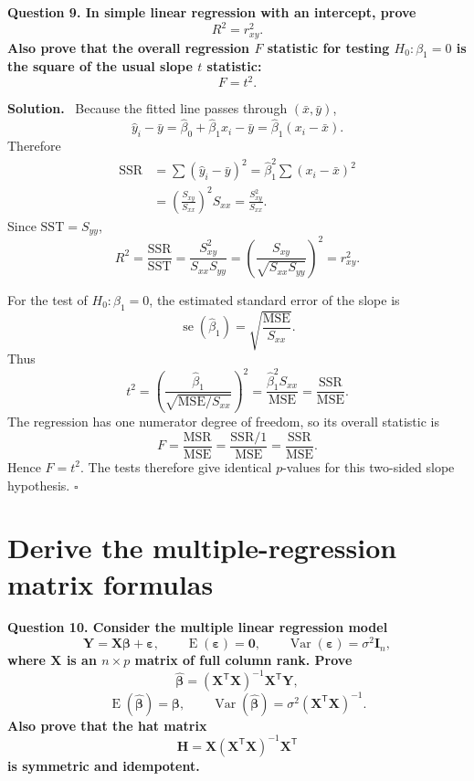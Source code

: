 \documentclass[11pt]{article}
\newcommand{\Sxx}{S_{xx}}
\newcommand{\Sxy}{S_{xy}}
\newcommand{\Syy}{S_{yy}}
\newcommand{\bzero}{\widehat{\beta}_0}
\newcommand{\bone}{\widehat{\beta}_1}
\newcommand{\yhat}{\widehat{y}}
\newcommand{\Var}{\operatorname{Var}}
\newcommand{\E}{\operatorname{E}}
\newenvironment{question}
  {\par\medskip\noindent\color{navy}\bfseries}
  {\par\medskip\color{black}}
\newenvironment{solution}
  {\noindent\color{darkgreen}\textbf{Solution.}\color{black}\ }
  {\hfill$\square$\par\medskip}
\begin{document}
\begin{question}
Question 9. In simple linear regression with an intercept, prove
\[
 \boxed{R^2=r_{xy}^2}.
\]
Also prove that the overall regression $F$ statistic for testing
$H_0:\beta_1=0$ is the square of the usual slope $t$ statistic:
\[
 \boxed{F=t^2}.
\]
\end{question}

\begin{solution}
Because the fitted line passes through $(\bar x,\bar y)$,
\[
 \yhat_i-\bar y
 =\bzero+\bone x_i-\bar y
 =\bone(x_i-\bar x).
\]
Therefore
\begin{align*}
\mathrm{SSR}
 &=\sum(\yhat_i-\bar y)^2
 =\bone^2\sum(x_i-\bar x)^2\\
 &=\left(\frac{\Sxy}{\Sxx}\right)^2\Sxx
 =\frac{\Sxy^2}{\Sxx}.
\end{align*}
Since $\mathrm{SST}=\Syy$,
\[
 R^2=\frac{\mathrm{SSR}}{\mathrm{SST}}
 =\frac{\Sxy^2}{\Sxx\Syy}
 =\left(\frac{\Sxy}{\sqrt{\Sxx\Syy}}\right)^2
 =r_{xy}^2.
\]

For the test of $H_0:\beta_1=0$, the estimated standard error of the slope is
\[
 \operatorname{se}(\bone)=\sqrt{\frac{\mathrm{MSE}}{\Sxx}}.
\]
Thus
\[
 t^2
 =\left(\frac{\bone}{\sqrt{\mathrm{MSE}/\Sxx}}\right)^2
 =\frac{\bone^2\Sxx}{\mathrm{MSE}}
 =\frac{\mathrm{SSR}}{\mathrm{MSE}}.
\]
The regression has one numerator degree of freedom, so its overall statistic is
\[
 F=\frac{\mathrm{MSR}}{\mathrm{MSE}}
 =\frac{\mathrm{SSR}/1}{\mathrm{MSE}}
 =\frac{\mathrm{SSR}}{\mathrm{MSE}}.
\]
Hence $F=t^2$. The tests therefore give identical $p$-values for this
two-sided slope hypothesis.
\end{solution}

\section{Derive the multiple-regression matrix formulas}

\begin{question}
Question 10. Consider the multiple linear regression model
\[
 \mathbf Y=\mathbf X\boldsymbol\beta+\boldsymbol\varepsilon,
 \qquad
 \E(\boldsymbol\varepsilon)=\mathbf 0,
 \qquad
 \Var(\boldsymbol\varepsilon)=\sigma^2\mathbf I_n,
\]
where $\mathbf X$ is an $n\times p$ matrix of full column rank. Prove
\[
 \boxed{\widehat{\boldsymbol\beta}
   =(\mathbf X^{\mathsf T}\mathbf X)^{-1}
     \mathbf X^{\mathsf T}\mathbf Y},
\]
\[
 \boxed{\E(\widehat{\boldsymbol\beta})=\boldsymbol\beta},
 \qquad
 \boxed{\Var(\widehat{\boldsymbol\beta})
   =\sigma^2(\mathbf X^{\mathsf T}\mathbf X)^{-1}}.
\]
Also prove that the hat matrix
\[
 \mathbf H=\mathbf X(\mathbf X^{\mathsf T}\mathbf X)^{-1}
             \mathbf X^{\mathsf T}
\]
is symmetric and idempotent.
\end{question}
\end{document}
